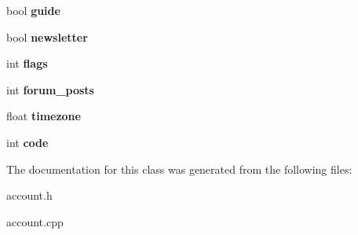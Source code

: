 \begin{DoxyCompactItemize}
\item 
\hypertarget{classaccount_a24cfe23c99afd8e2dd1c5eb479c5099a}{bool {\bfseries guide}}\label{classaccount_a24cfe23c99afd8e2dd1c5eb479c5099a}

\item 
\hypertarget{classaccount_ac79e04b34415777a4ca74fffd0999c32}{bool {\bfseries newsletter}}\label{classaccount_ac79e04b34415777a4ca74fffd0999c32}

\item 
\hypertarget{classaccount_a9a252c3f2ba9386ca20fc3c48bf87f43}{int {\bfseries flags}}\label{classaccount_a9a252c3f2ba9386ca20fc3c48bf87f43}

\item 
\hypertarget{classaccount_acf8a77ab282ed9ba8a45bccf97cd30f8}{int {\bfseries forum\-\_\-posts}}\label{classaccount_acf8a77ab282ed9ba8a45bccf97cd30f8}

\item 
\hypertarget{classaccount_a7eb216076728b85fb3ce1dc89b794f87}{float {\bfseries timezone}}\label{classaccount_a7eb216076728b85fb3ce1dc89b794f87}

\item 
\hypertarget{classaccount_adfc7ed36bceef7a04d39e6ba19bc001c}{int {\bfseries code}}\label{classaccount_adfc7ed36bceef7a04d39e6ba19bc001c}

\end{DoxyCompactItemize}


The documentation for this class was generated from the following files\-:\begin{DoxyCompactItemize}
\item 
account.\-h\item 
account.\-cpp\end{DoxyCompactItemize}
